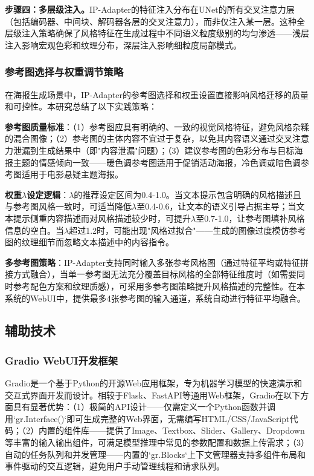 \documentclass[12pt,a4paper]{ctexart}
\newcommand{\ipadapter}{IP-Adapter}
\begin{document}
\textbf{步骤四：多层级注入。}\ipadapter{}的特征注入分布在UNet的所有交叉注意力层（包括编码器、中间块、解码器各层的交叉注意力），而非仅注入某一层。这种全层级注入策略确保了风格特征在生成过程中不同语义粒度级别的均匀渗透——浅层注入影响宏观色彩和纹理分布，深层注入影响细粒度局部模式。

\subsubsection{参考图选择与权重调节策略}

在海报生成场景中，\ipadapter{}的参考图选择和权重设置直接影响风格迁移的质量和可控性。本研究总结了以下实践策略：

\textbf{参考图质量标准}：（1）参考图应具有明确的、一致的视觉风格特征，避免风格杂糅的混合图像；（2）参考图的主体内容不宜过于复杂，以免其内容语义通过交叉注意力泄漏到生成结果中（即"内容泄漏"问题）；（3）建议参考图的色彩分布与目标海报主题的情感倾向一致——暖色调参考图适用于促销活动海报，冷色调或暗色调参考图适用于电影悬疑主题海报。

\textbf{权重$\lambda$设定逻辑}：$\lambda$的推荐设定区间为0.4-1.0。当文本提示包含明确的风格描述且与参考图风格一致时，可适当降低$\lambda$至0.4-0.6，让文本的语义引导占据主导；当文本提示侧重内容描述而对风格描述较少时，可提升$\lambda$至0.7-1.0，让参考图填补风格信息的空白。当$\lambda$超过1.2时，可能出现"风格过拟合"——生成的图像过度模仿参考图的纹理细节而忽略文本描述中的内容指令。

\textbf{多参考图策略}：\ipadapter{}支持同时输入多张参考风格图（通过特征平均或特征拼接方式融合），当单一参考图无法充分覆盖目标风格的全部特征维度时（如需要同时参考配色方案和纹理质感），可采用多参考图策略提升风格描述的完整性。在本系统的WebUI中，提供最多4张参考图的输入通道，系统自动进行特征平均融合。

\subsection{辅助技术}

\subsubsection{Gradio WebUI开发框架}

Gradio是一个基于Python的开源Web应用框架，专为机器学习模型的快速演示和交互式界面开发而设计。相较于Flask、FastAPI等通用Web框架，Gradio在以下方面具有显著优势：（1）极简的API设计——仅需定义一个Python函数并调用`gr.Interface()`即可生成完整的Web界面，无需编写HTML/CSS/JavaScript代码；（2）内置的组件库——提供了Image、Textbox、Slider、Gallery、Dropdown等丰富的输入输出组件，可满足模型推理中常见的参数配置和数据上传需求；（3）自动的任务队列和并发管理——内置的`gr.Blocks`上下文管理器支持多组件布局和事件驱动的交互逻辑，避免用户手动管理线程和请求队列。
\end{document}
